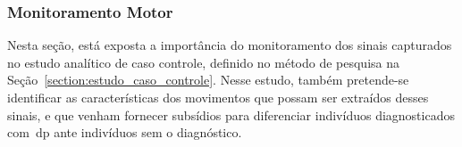% 
% 
% 



\subsubsection{Monitoramento Motor}
Nesta seção, está exposta a importância do monitoramento dos sinais capturados no estudo analítico de caso controle, definido no método de pesquisa na Seção~\ref{section:estudo_caso_controle}. Nesse estudo, também pretende-se identificar as características dos movimentos que possam ser extraídos desses sinais, e que venham fornecer subsídios para diferenciar indivíduos diagnosticados com~\ac{dp} ante indivíduos sem o diagnóstico.

